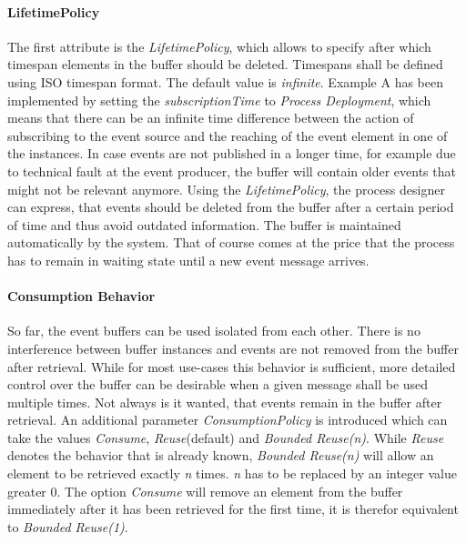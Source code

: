 \paragraph{LifetimePolicy\newline}

The first attribute is the \textit{LifetimePolicy}, which allows to specify after which timespan elements in the buffer should be deleted. Timespans shall be defined using ISO timespan format. 
The default value is \textit{infinite}.
Example A has been implemented by setting the \textit{subscriptionTime} to \textit{Process Deployment}, which means that there can be an infinite time difference between the action of subscribing to the event source and the reaching of the event element in one of the instances.
In case events are not published in a longer time, for example due to technical fault at the event producer, the buffer will contain older events that might not be relevant anymore.
Using the \textit{LifetimePolicy}, the process designer can express, that events should be deleted from the buffer after a certain period of time and thus avoid outdated information. The buffer is maintained automatically by the system.
That of course comes at the price that the process has to remain in waiting state until a new event message arrives.

\paragraph{Consumption Behavior\newline}

So far, the event buffers can be used isolated from each other. There is no interference between buffer instances and events are not removed from the buffer after retrieval.
While for most use-cases this behavior is sufficient, more detailed control over the buffer can be desirable when a given message shall be used multiple times.
Not always is it wanted, that events remain in the buffer after retrieval.
An additional parameter \textit{ConsumptionPolicy} is introduced which can take the values \textit{Consume}, \textit{Reuse}(default) and \textit{Bounded Reuse(n)}.
While \textit{Reuse} denotes the behavior that is already known, \textit{Bounded Reuse(n)} will allow an element to be retrieved exactly \textit{n} times. \textit{n} has to be replaced by an integer value greater 0.
The option \textit{Consume} will remove an element from the buffer immediately after it has been retrieved for the first time, it is therefor equivalent to \textit{Bounded Reuse(1)}.

